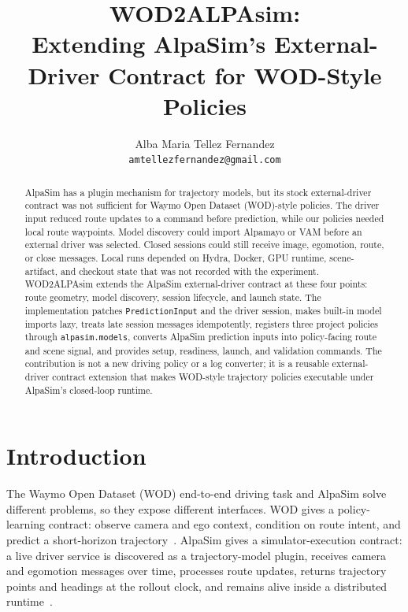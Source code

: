 \documentclass{article}
\title{WOD2ALPAsim:\\
Extending AlpaSim's External-Driver Contract for WOD-Style Policies}
\author{
  Alba Maria Tellez Fernandez\\
  \texttt{amtellezfernandez@gmail.com}
}
\begin{document}
\maketitle

\begin{abstract}
AlpaSim has a plugin mechanism for trajectory models, but its stock external-driver
contract was not sufficient for Waymo Open Dataset (WOD)-style policies. The driver input
reduced route updates to a command before prediction, while our policies needed local
route waypoints. Model discovery could import Alpamayo or VAM before an external driver
was selected. Closed sessions could still receive image, egomotion, route, or close
messages. Local runs depended on Hydra, Docker, GPU runtime, scene-artifact, and checkout
state that was not recorded with the experiment. WOD2ALPAsim extends the AlpaSim
external-driver contract at these four points: route geometry, model discovery, session
lifecycle, and launch state. The implementation patches \texttt{PredictionInput} and the
driver session, makes built-in model imports lazy, treats late session messages
idempotently, registers three project policies through \texttt{alpasim.models}, converts
AlpaSim prediction inputs into policy-facing route and scene signal, and provides setup,
readiness, launch, and validation commands. The contribution is not a new driving policy
or a log converter; it is a reusable external-driver contract extension that makes
WOD-style trajectory policies executable under AlpaSim's closed-loop runtime.
\end{abstract}

\section{Introduction}

The Waymo Open Dataset (WOD) end-to-end driving task and AlpaSim solve different
problems, so they expose different interfaces. WOD gives a policy-learning contract:
observe camera and ego context, condition on route intent, and predict a short-horizon
trajectory~\citep{sun2020scalability}. AlpaSim gives a simulator-execution contract: a
live driver service is discovered as a trajectory-model plugin, receives camera and
egomotion messages over time, processes route updates, returns trajectory points and
headings at the rollout clock, and remains alive inside a distributed runtime~\citep{alpasim2026}.
\end{document}
